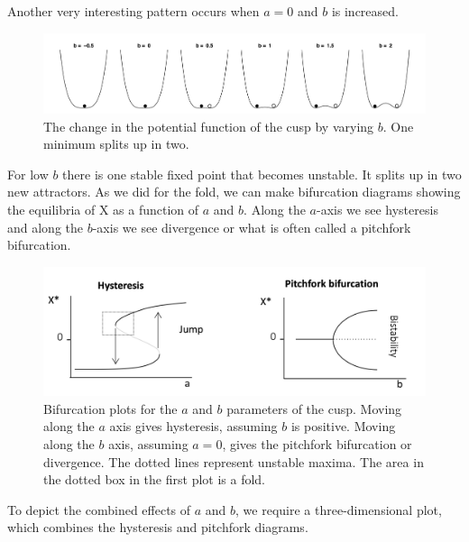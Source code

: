 \documentclass[
  a4paper,
  DIV=11,
  numbers=noendperiod,
  oneside]{scrreprt}
\begin{document}
Another very interesting pattern occurs when \(a = 0\) and \(b\) is
increased.

\begin{figure}

{\centering \includegraphics{media/ch3/image8.jpg}

}

\caption{\label{fig-ch3-img8-old-20}The change in the potential function
of the cusp by varying \(b\). One minimum splits up in two.}

\end{figure}

For low \(b\) there is one stable fixed point that becomes unstable. It
splits up in two new attractors. As we did for the fold, we can make
bifurcation diagrams showing the equilibria of X as a function of \(a\)
and \(b\). Along the \(a\)-axis we see hysteresis and along the
\(b\)-axis we see divergence or what is often called a pitchfork
bifurcation.

\begin{figure}

{\centering \includegraphics{media/ch3/image9.jpg}

}

\caption{\label{fig-ch3-img9-old-21}Bifurcation plots for the \(a\) and
\(b\) parameters of the cusp. Moving along the \(a\) axis gives
hysteresis, assuming \(b\) is positive. Moving along the \(b\) axis,
assuming \(a=0\), gives the pitchfork bifurcation or divergence. The
dotted lines represent unstable maxima. The area in the dotted box in
the first plot is a fold.}

\end{figure}

To depict the combined effects of \(a\) and \(b\), we require a
three-dimensional plot, which combines the hysteresis and pitchfork
diagrams.
\end{document}

